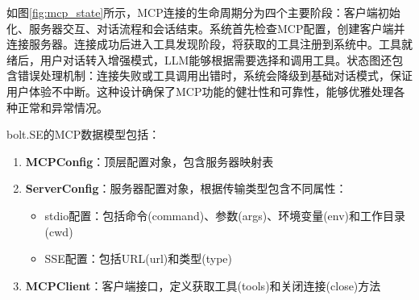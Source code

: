     
    
    
    
    
如图\ref{fig:mcp_state}所示，MCP连接的生命周期分为四个主要阶段：客户端初始化、服务器交互、对话流程和会话结束。系统首先检查MCP配置，创建客户端并连接服务器。连接成功后进入工具发现阶段，将获取的工具注册到系统中。工具就绪后，用户对话转入增强模式，LLM能够根据需要选择和调用工具。状态图还包含错误处理机制：连接失败或工具调用出错时，系统会降级到基础对话模式，保证用户体验不中断。这种设计确保了MCP功能的健壮性和可靠性，能够优雅处理各种正常和异常情况。

bolt.SE的MCP数据模型包括：

\begin{enumerate}
  \item \textbf{MCPConfig}：顶层配置对象，包含服务器映射表
  
  \item \textbf{ServerConfig}：服务器配置对象，根据传输类型包含不同属性：
    \begin{itemize}
      \item stdio配置：包括命令(command)、参数(args)、环境变量(env)和工作目录(cwd)
      \item SSE配置：包括URL(url)和类型(type)
    \end{itemize}
  
  \item \textbf{MCPClient}：客户端接口，定义获取工具(tools)和关闭连接(close)方法
\end{enumerate}

